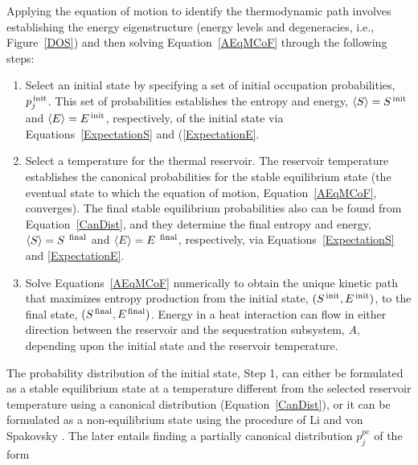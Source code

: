 \documentclass[
journal=jcisd8, %
manuscript=article,
layout=twocolumn   %
]{achemso}
\begin{document}
Applying the equation of motion to identify the thermodynamic path involves establishing the energy eigenstructure (energy levels and degeneracies, i.e., Figure~\ref{DOS}) and then solving Equation~\ref{AEqMCoF} through the following steps:
\begin{enumerate}
\item Select an initial state by specifying a set of initial occupation probabilities, $p_j^{\,\tiny \text{init}}$. This set of probabilities establishes the entropy and energy, $\langle S \rangle = S^{\,\tiny \text{init}}$ and $\langle E \rangle = E^{\,\tiny \text{init}}$, respectively, of the initial state via Equations~\ref{ExpectationS} and (\ref{ExpectationE}.
\item Select a temperature for the thermal reservoir. The reservoir temperature establishes the canonical probabilities for the stable equilibrium state (the eventual state to which the equation of motion, Equation~\ref{AEqMCoF}, converges). The final stable equilibrium probabilities also can be found from Equation~\ref{CanDist}, and they determine the final entropy and energy, $\langle S \rangle =S^{\,\tiny \text{ final}}$ and $\langle E \rangle = E^{\,\tiny \text{ final}}$, respectively, via Equations~\ref{ExpectationS}  and \ref{ExpectationE}.
\item Solve Equations~\ref{AEqMCoF} numerically to obtain the unique kinetic path that maximizes entropy production from the initial state, $(S^{\,\tiny \text{init}},E^{\,\tiny \text{init}})$, to the final state, $(S^{\,\tiny \text{final}},E^{\,\tiny \text{final}})$.  Energy in a heat interaction can flow in either direction between the reservoir and the sequestration subsystem, $A$, depending upon the initial state and the reservoir temperature.
\end{enumerate}

The probability distribution of the initial state, Step 1, can either be formulated as a stable equilibrium state at a temperature different from the selected reservoir temperature using a canonical distribution (Equation~\ref{CanDist}), or it can be formulated as a non-equilibrium state using the procedure of Li and von Spakovsky \cite{Li2016a, Li2016b}. The later entails finding a partially canonical distribution $p_j^{{pe}}$ of the form
\end{document}
